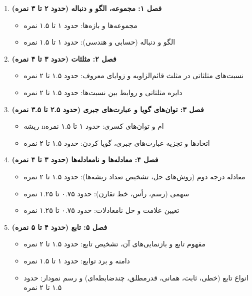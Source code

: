 \documentclass[12pt,a4paper]{article}
\begin{document}
\begin{enumerate}[label=\textbf{\arabic*.}, wide, labelindent=0pt]
    \item \textbf{فصل ۱: مجموعه، الگو و دنباله (حدود ۲ تا ۳ نمره)}
    \begin{itemize}
        \item مجموعه‌ها و بازه‌ها: حدود ۱ تا ۱.۵ نمره
        \item الگو و دنباله (حسابی و هندسی): حدود ۱ تا ۱.۵ نمره
    \end{itemize}

    \item \textbf{فصل ۲: مثلثات (حدود ۳ تا ۴ نمره)}
    \begin{itemize}
        \item نسبت‌های مثلثاتی در مثلث قائم‌الزاویه و زوایای معروف: حدود ۱.۵ تا ۲ نمره
        \item دایره مثلثاتی و روابط بین نسبت‌ها: حدود ۱.۵ تا ۲ نمره
    \end{itemize}

    \item \textbf{فصل ۳: توان‌های گویا و عبارت‌های جبری (حدود ۲.۵ تا ۳.۵ نمره)}
    \begin{itemize}
        \item ریشه nام و توان‌های کسری: حدود ۱ تا ۱.۵ نمره
        \item اتحادها و تجزیه عبارت‌های جبری، گویا کردن: حدود ۱.۵ تا ۲ نمره
    \end{itemize}

    \item \textbf{فصل ۴: معادله‌ها و نامعادله‌ها (حدود ۳ تا ۴ نمره)}
    \begin{itemize}
        \item معادله درجه دوم (روش‌های حل، تشخیص تعداد ریشه‌ها): حدود ۱.۵ تا ۲ نمره
        \item سهمی (رسم، رأس، خط تقارن): حدود ۰.۷۵ تا ۱.۲۵ نمره
        \item تعیین علامت و حل نامعادلات: حدود ۰.۷۵ تا ۱.۲۵ نمره
    \end{itemize}

    \item \textbf{فصل ۵: تابع (حدود ۴ تا ۵ نمره)}
    \begin{itemize}
        \item مفهوم تابع و بازنمایی‌های آن، تشخیص تابع: حدود ۱.۵ تا ۲ نمره
        \item دامنه و برد توابع: حدود ۱ تا ۱.۵ نمره
        \item انواع تابع (خطی، ثابت، همانی، قدرمطلق، چندضابطه‌ای) و رسم نمودار: حدود ۱.۵ تا ۲ نمره
    \end{itemize}


\end{enumerate}
\end{document}

